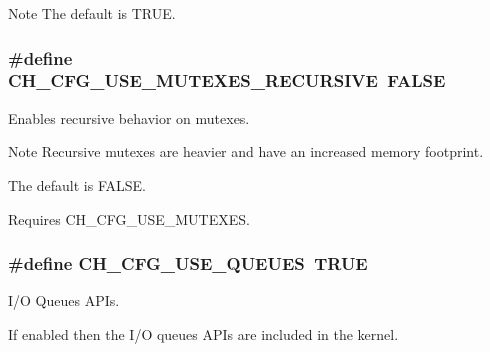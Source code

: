 \begin{DoxyNote}{Note}
The default is {\ttfamily T\+R\+U\+E}. 
\end{DoxyNote}
\hypertarget{group__config_gab9a61e9638af4b918ebad4e177dead4d}{
\subsubsection[{C\+H\+\_\+\+C\+F\+G\+\_\+\+U\+S\+E\+\_\+\+M\+U\+T\+E\+X\+E\+S\+\_\+\+R\+E\+C\+U\+R\+S\+I\+V\+E}]{\setlength{\rightskip}{0pt plus 5cm}\#define C\+H\+\_\+\+C\+F\+G\+\_\+\+U\+S\+E\+\_\+\+M\+U\+T\+E\+X\+E\+S\+\_\+\+R\+E\+C\+U\+R\+S\+I\+V\+E~F\+A\+L\+S\+E}}\label{group__config_gab9a61e9638af4b918ebad4e177dead4d}


Enables recursive behavior on mutexes. 

\begin{DoxyNote}{Note}
Recursive mutexes are heavier and have an increased memory footprint.

The default is {\ttfamily F\+A\+L\+S\+E}. 

Requires {\ttfamily C\+H\+\_\+\+C\+F\+G\+\_\+\+U\+S\+E\+\_\+\+M\+U\+T\+E\+X\+E\+S}. 
\end{DoxyNote}
\hypertarget{group__config_ga9bb08f7384ee7ec4893bb28723286ee3}{
\subsubsection[{C\+H\+\_\+\+C\+F\+G\+\_\+\+U\+S\+E\+\_\+\+Q\+U\+E\+U\+E\+S}]{\setlength{\rightskip}{0pt plus 5cm}\#define C\+H\+\_\+\+C\+F\+G\+\_\+\+U\+S\+E\+\_\+\+Q\+U\+E\+U\+E\+S~T\+R\+U\+E}}\label{group__config_ga9bb08f7384ee7ec4893bb28723286ee3}


I/\+O Queues A\+P\+Is. 

If enabled then the I/\+O queues A\+P\+Is are included in the kernel.


